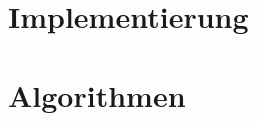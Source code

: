 \documentclass[ngerman
  ,fontsize=11pt %
  ,numbers=noenddot %
  ,parskip=half*
  ,openany
  ,DIV=10
  ,fleqn %
  ,oneside
]{./myClass}
\begin{document}
\ifnum{}
  \frontmatter
  
  \newpage \thispagestyle{empty} \mbox{}
\else
  \mainmatter
\fi

\tableofcontents{}


\ifnum{}
  \mainmatter
\fi

\chapter{Implementierung}


\chapter{Algorithmen}



%

\pagebreak
\appendix
{}



\end{document}
